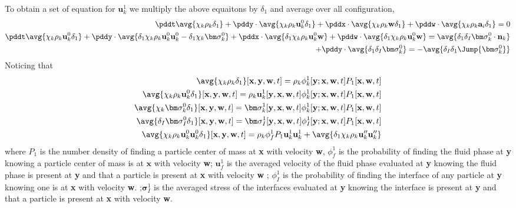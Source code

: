 To obtain a set of equation for $\textbf{u}_k^1$ we multiply the above equaitons by $\delta_1$ and average over all configuration, 
\begin{align*}
    \pddt \avg{\chi_k \rho_k \delta_1}
    +  \pddy \cdot \avg{\chi_k \rho_k  \textbf{u}_k^0\delta_1} 
    +  \pddx \cdot \avg{\chi_k \rho_k  \textbf{w} \delta_1} 
    +  \pddw \cdot \avg{\chi_k \rho_k  \textbf{a}_i \delta_1} 
    = 0 \\
    \pddt \avg{\chi_k \rho_k \textbf{u}_k^0 \delta_1} 
    +  \pddy\cdot \avg{\delta_1\chi_k \rho_k  \textbf{u}_k^0\textbf{u}_k^0 
    - \delta_1\chi_k \bm\sigma_k^0 } 
    +  \pddx\cdot \avg{\delta_1\chi_k \rho_k  \textbf{u}_k^0 \textbf{w}}
    +  \pddw\cdot \avg{\delta_1\chi_k \rho_k  \textbf{u}_k^0 \textbf{w}}
    = \avg{\delta_1\delta_I \bm\sigma_k^0 \cdot \textbf{n}_k}\\
    +  \pddy \cdot \avg{\delta_1 \delta_I \bm\sigma_k^0 }= - \avg{\delta_I \delta_1 \Jump{\bm\sigma_k^0}}
\end{align*}
Noticing that 
\begin{align*}
    \avg{\chi_k \rho_k \delta_1}[\textbf{x},\textbf{y},\textbf{w},t]
    = \rho_k \phi_k^1[\textbf{y};\textbf{x},\textbf{w},t] P_1[\textbf{x},\textbf{w},t]\\
    \avg{\chi_k \rho_k \textbf{u}_k^0 \delta_1}[\textbf{x},\textbf{y},\textbf{w},t]
    = \rho_k\textbf{u}_k^1[\textbf{y},\textbf{x},\textbf{w},t] \phi_k^1[\textbf{y};\textbf{x},\textbf{w},t] P_1[\textbf{x},\textbf{w},t]\\
    \avg{\chi_k \bm\sigma_k^0 \delta_1}[\textbf{x},\textbf{y},\textbf{w},t]
    = \bm\sigma_k^1[\textbf{y},\textbf{x},\textbf{w},t] \phi_k^1[\textbf{y};\textbf{x},\textbf{w},t] P_1[\textbf{x},\textbf{w},t]\\
    \avg{\delta_I \bm\sigma_I^0 \delta_1}[\textbf{x},\textbf{y},\textbf{w},t]
    = \bm\sigma_I^1[\textbf{y},\textbf{x},\textbf{w},t] \phi_I^1[\textbf{y};\textbf{x},\textbf{w},t] P_1[\textbf{x},\textbf{w},t]\\
    \avg{\chi_k \rho_k \textbf{u}_k^0  \textbf{u}_k^0 \delta_1}[\textbf{x},\textbf{y},\textbf{w},t]
    =
    \rho_k \phi_f^1 P_1 \textbf{u}_k^1 \textbf{u}_k^1
    + \avg{\delta_1 \chi_k \rho_k \textbf{u}_k''  \textbf{u}_k'' }
    \\
\end{align*}
where $P_1$ is the number density of finding a particle center of mass at \textbf{x} with velocity \textbf{w}, $\phi_f^1$ is the probability of finding the fluid phase at \textbf{y} knowing a particle center of mass is at $\textbf{x}$ with velocity \textbf{w}; $\textbf{u}_f^1$ is the averaged velocity of the fluid phase evaluated at \textbf{y} knowing the fluid phase is present at \textbf{y} and that a particle is present at \textbf{x} with velocity \textbf{w} 
; $\phi_I^1$ is the probability of finding the interface of any particle at \textbf{y} knowing one is at \textbf{x} with velocity \textbf{w}. 
;$\bm\sigma_I^1$ is the averaged stress of the interfaces evaluated at \textbf{y} knowing the interface is present at \textbf{y} and that a particle is present at \textbf{x} with velocity \textbf{w}. 

